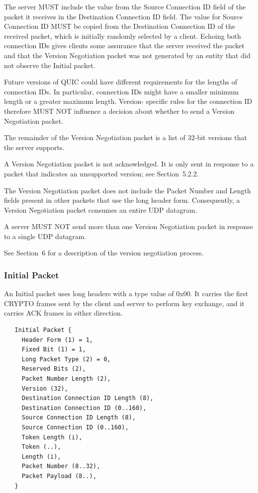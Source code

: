 \documentclass{article}
\begin{document}
The server MUST include the value from the Source Connection ID field of the packet it receives in the Destination Connection ID field. The value for Source Connection ID MUST be copied from the Destination Connection ID of the received packet, which is initially randomly selected by a client.  Echoing both connection IDs gives clients some assurance that the server received the packet and that the Version Negotiation packet was not generated by an entity that did not observe the Initial packet.

Future versions of QUIC could have different requirements for the lengths of connection IDs.  In particular, connection IDs might have a smaller minimum length or a greater maximum length.  Version- specific rules for the connection ID therefore MUST NOT influence a decision about whether to send a Version Negotiation packet.

The remainder of the Version Negotiation packet is a list of 32-bit versions that the server supports.

A Version Negotiation packet is not acknowledged.  It is only sent in response to a packet that indicates an unsupported version; see Section~5.2.2.

The Version Negotiation packet does not include the Packet Number and Length fields present in other packets that use the long header form. Consequently, a Version Negotiation packet consumes an entire UDP datagram.

A server MUST NOT send more than one Version Negotiation packet in response to a single UDP datagram.

See Section~6 for a description of the version negotiation process.

\subsubsection{Initial Packet}

An Initial packet uses long headers with a type value of 0x00.  It carries the first CRYPTO frames sent by the client and server to perform key exchange, and it carries ACK frames in either direction.

\begin{verbatim}
   Initial Packet {
     Header Form (1) = 1,
     Fixed Bit (1) = 1,
     Long Packet Type (2) = 0,
     Reserved Bits (2),
     Packet Number Length (2),
     Version (32),
     Destination Connection ID Length (8),
     Destination Connection ID (0..160),
     Source Connection ID Length (8),
     Source Connection ID (0..160),
     Token Length (i),
     Token (..),
     Length (i),
     Packet Number (8..32),
     Packet Payload (8..),
   }
\end{verbatim}
\end{document}

